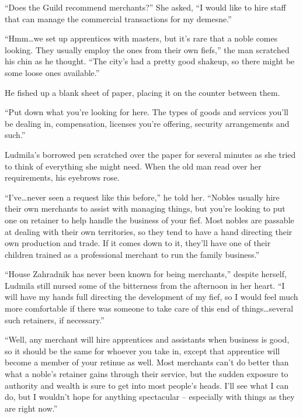  

“Does the Guild recommend merchants?” She asked, “I would like to hire staff that can manage the commercial transactions for my demesne.”

 

“Hmm…we set up apprentices with masters, but it’s rare that a noble comes looking. They usually employ the ones from their own fiefs,” the man scratched his chin as he thought. “The city’s had a pretty good shakeup, so there might be some loose ones available.”

 

He fished up a blank sheet of paper, placing it on the counter between them.

 

“Put down what you’re looking for here. The types of goods and services you’ll be dealing in, compensation, licenses you’re offering, security arrangements and such.”

 

Ludmila’s borrowed pen scratched over the paper for several minutes as she tried to think of everything she might need. When the old man read over her requirements, his eyebrows rose.

 

“I’ve…never seen a request like this before,” he told her. “Nobles usually hire their own merchants to assist with managing things, but you’re looking to put one on retainer to help handle the business of your fief. Most nobles are passable at dealing with their own territories, so they tend to have a hand directing their own production and trade. If it comes down to it, they’ll have one of their children trained as a professional merchant to run the family business.”

 

“House Zahradnik has never been known for being merchants,” despite herself, Ludmila still nursed some of the bitterness from the afternoon in her heart. “I will have my hands full directing the development of my fief, so I would feel much more comfortable if there was someone to take care of this end of things…several such retainers, if necessary.”

 

“Well, any merchant will hire apprentices and assistants when business is good, so it should be the same for whoever you take in, except that apprentice will become a member of your retinue as well. Most merchants can’t do better than what a noble’s retainer gains through their service, but the sudden exposure to authority and wealth is sure to get into most people’s heads. I’ll see what I can do, but I wouldn’t hope for anything spectacular – especially with things as they are right now.”

